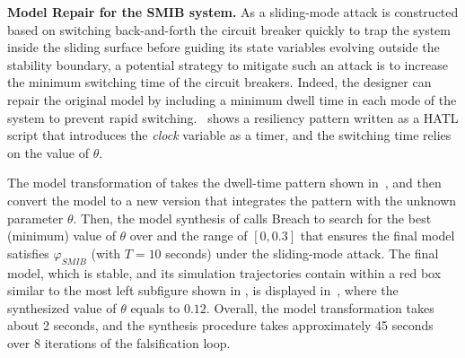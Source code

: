 \vspace{0.5em}
\noindent
{\bf Model Repair for the SMIB system.} 
As a sliding-mode attack is constructed based on switching back-and-forth the circuit breaker quickly to trap the system inside the sliding surface before guiding its state variables evolving outside the stability boundary, a potential strategy to mitigate such an attack is to increase the minimum switching time of the circuit breakers. Indeed, the designer can repair the original model by including a minimum dwell time in each mode of the system to prevent rapid switching.~ shows a resiliency pattern written as a HATL script that introduces the \emph{clock} variable as a timer, and the switching time relies on the value of $\theta$.

The model transformation of \toolreaffirm takes the dwell-time pattern shown in~, and then convert the model to a new version that integrates the pattern with the unknown parameter $\theta$.
%
Then, the model synthesis of \toolreaffirm calls Breach to search for the best (\ie minimum) value of $\theta$ over and the range of $[0, 0.3]$ that ensures the final model satisfies $\varphi_{SMIB}$ (with $T = 10$ seconds) under the sliding-mode attack. The final model, which is stable, and its simulation trajectories contain within a red box similar to the most left subfigure shown in , is displayed in~, where the synthesized value of $\theta$ equals to $0.12$. Overall, the model transformation takes about 2 seconds, and the synthesis procedure takes approximately 45 seconds over 8 iterations of the falsification loop.





